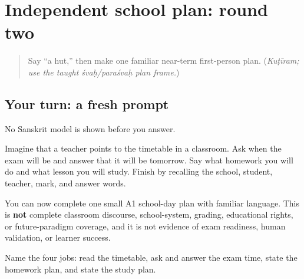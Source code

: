 \section[(independent school plan, second round)]{Independent school plan: round two}

\label{lesson:SA-C267-school-plan-retrieval}



\begin{quote}
Say “a hut,” then make one familiar near-term first-person plan. (\emph{Kuṭīram; use the taught śvaḥ/paraśvaḥ plan frame.})
\end{quote}

\subsection*{Your turn: a fresh prompt}
No Sanskrit model is shown before you answer.

Imagine that a teacher points to the timetable in a classroom. Ask when the exam will be and answer that it will be tomorrow. Say what homework you will do and what lesson you will study. Finish by recalling the school, student, teacher, mark, and answer words.

\begin{grammarlens}[title={What you've built: boundary}]
You can now complete one small A1 school-day plan with familiar language. This is \textbf{not} complete classroom discourse, school-system, grading, educational rights, or future-paradigm coverage, and it is not evidence of exam readiness, human validation, or learner success.
\end{grammarlens}

\begin{tcolorbox}[breakable,colback=teal!4,colframe=teal!35!black,title={Before you move on}]
Name the four jobs: read the timetable, ask and answer the exam time, state the homework plan, and state the study plan.
\end{tcolorbox}
